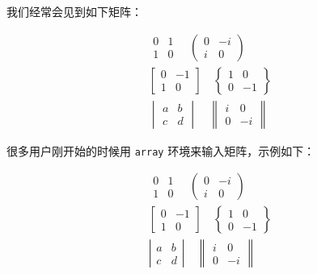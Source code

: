 我们经常会见到如下矩阵：
\begin{example}
\begin{gather*}
 \begin{matrix}  0 &  1 \\ 1 &  0 \end{matrix}\quad
 \begin{pmatrix} 0 & -i \\ i &  0 \end{pmatrix}\\
 \begin{bmatrix} 0 & -1 \\ 1 &  0 \end{bmatrix}\quad
 \begin{Bmatrix} 1 &  0 \\ 0 & -1 \end{Bmatrix}\\
 \begin{vmatrix} a &  b \\ c &  d \end{vmatrix}\quad
 \begin{Vmatrix} i &  0 \\ 0 & -i \end{Vmatrix}
\end{gather*}
\end{example}

很多用户刚开始的时候用 \verb|array| 环境来输入矩阵，示例如下：
\begin{latexcode}
\begin{gather*}
 \begin{array}{cc}  0 &  1 \\ 1 &  0 \end{array}  \quad
 \left(\begin{array}{cc}  0 & -i \\ i &  0 \end{array}\right) \\
 \left[\begin{array}{cc} 0 & -1 \\ 1 &  0 \end{array}\right] \quad
 \left\{\begin{array}{cc} 1 &  0 \\ 0 & -1 \end{array}\right\} \\
 \left|\begin{array}{cc} a &  b \\ c &  d \end{array}\right| \quad
 \left\|\begin{array}{cc} i &  0 \\ 0 & -i \end{array}\right\|
\end{gather*}
\end{latexcode}


